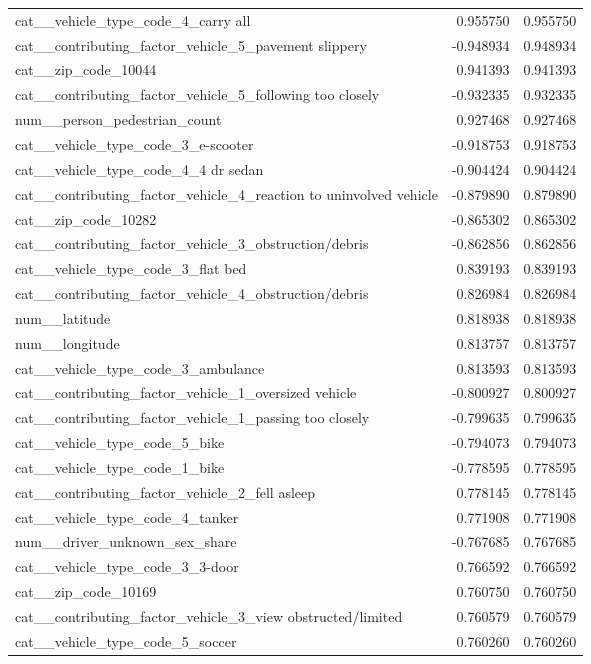 \begin{tabular}{lrr}
cat__vehicle_type_code_4_carry all & 0.955750 & 0.955750 \\
cat__contributing_factor_vehicle_5_pavement slippery & -0.948934 & 0.948934 \\
cat__zip_code_10044 & 0.941393 & 0.941393 \\
cat__contributing_factor_vehicle_5_following too closely & -0.932335 & 0.932335 \\
num__person_pedestrian_count & 0.927468 & 0.927468 \\
cat__vehicle_type_code_3_e-scooter & -0.918753 & 0.918753 \\
cat__vehicle_type_code_4_4 dr sedan & -0.904424 & 0.904424 \\
cat__contributing_factor_vehicle_4_reaction to uninvolved vehicle & -0.879890 & 0.879890 \\
cat__zip_code_10282 & -0.865302 & 0.865302 \\
cat__contributing_factor_vehicle_3_obstruction/debris & -0.862856 & 0.862856 \\
cat__vehicle_type_code_3_flat bed & 0.839193 & 0.839193 \\
cat__contributing_factor_vehicle_4_obstruction/debris & 0.826984 & 0.826984 \\
num__latitude & 0.818938 & 0.818938 \\
num__longitude & 0.813757 & 0.813757 \\
cat__vehicle_type_code_3_ambulance & 0.813593 & 0.813593 \\
cat__contributing_factor_vehicle_1_oversized vehicle & -0.800927 & 0.800927 \\
cat__contributing_factor_vehicle_1_passing too closely & -0.799635 & 0.799635 \\
cat__vehicle_type_code_5_bike & -0.794073 & 0.794073 \\
cat__vehicle_type_code_1_bike & -0.778595 & 0.778595 \\
cat__contributing_factor_vehicle_2_fell asleep & 0.778145 & 0.778145 \\
cat__vehicle_type_code_4_tanker & 0.771908 & 0.771908 \\
num__driver_unknown_sex_share & -0.767685 & 0.767685 \\
cat__vehicle_type_code_3_3-door & 0.766592 & 0.766592 \\
cat__zip_code_10169 & 0.760750 & 0.760750 \\
cat__contributing_factor_vehicle_3_view obstructed/limited & 0.760579 & 0.760579 \\
cat__vehicle_type_code_5_soccer & 0.760260 & 0.760260 \\

\end{tabular}
